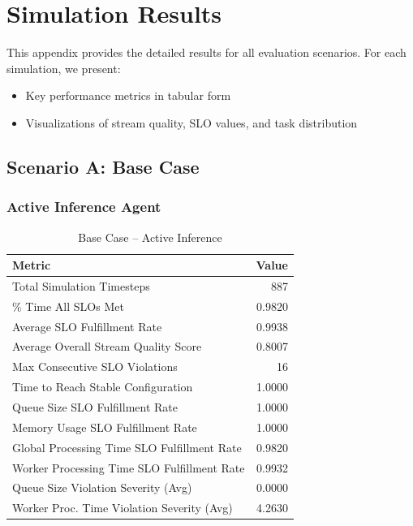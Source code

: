 \appendix
\chapter{Simulation Results}

This appendix provides the detailed results for all evaluation scenarios. For each simulation, we present:
\begin{itemize}
    \item Key performance metrics in tabular form
    \item Visualizations of stream quality, SLO values, and task distribution
\end{itemize}

\section{Scenario A: Base Case}

\subsection*{Active Inference Agent}
\begin{table}[h]
\centering
\caption{Base Case – Active Inference}
\label{tab:base_active_inference}
\begin{tabular}{lr}
\toprule
Metric & Value \\
\midrule
Total Simulation Timesteps & 887 \\
\% Time All SLOs Met & 0.9820 \\
Average SLO Fulfillment Rate & 0.9938 \\
Average Overall Stream Quality Score & 0.8007 \\
Max Consecutive SLO Violations & 16 \\
Time to Reach Stable Configuration & 1.0000 \\
Queue Size SLO Fulfillment Rate & 1.0000 \\
Memory Usage SLO Fulfillment Rate & 1.0000 \\
Global Processing Time SLO Fulfillment Rate & 0.9820 \\
Worker Processing Time SLO Fulfillment Rate & 0.9932 \\
Queue Size Violation Severity (Avg) & 0.0000 \\
Worker Proc. Time Violation Severity (Avg) & 4.2630 \\
\bottomrule
\end{tabular}
\end{table}


